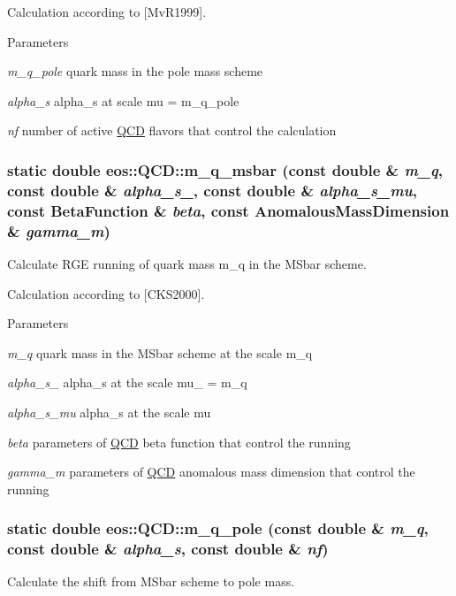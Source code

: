 Calculation according to \mbox{[}MvR1999\mbox{]}.


\begin{DoxyParams}{Parameters}
\item[{\em m\_\-q\_\-pole}]quark mass in the pole mass scheme \item[{\em alpha\_\-s}]alpha\_\-s at scale mu = m\_\-q\_\-pole \item[{\em nf}]number of active \hyperlink{classeos_1_1QCD}{QCD} flavors that control the calculation \end{DoxyParams}
\hypertarget{classeos_1_1QCD_ad982972648053f9f5a7e41ec73e07346}{
\subsubsection[{m\_\-q\_\-msbar}]{\setlength{\rightskip}{0pt plus 5cm}static double eos::QCD::m\_\-q\_\-msbar (const double \& {\em m\_\-q}, \/  const double \& {\em alpha\_\-s\_}, \/  const double \& {\em alpha\_\-s\_\-mu}, \/  const {\bf BetaFunction} \& {\em beta}, \/  const {\bf AnomalousMassDimension} \& {\em gamma\_\-m})}}
\label{classeos_1_1QCD_ad982972648053f9f5a7e41ec73e07346}
Calculate RGE running of quark mass m\_\-q in the MSbar scheme.

Calculation according to \mbox{[}CKS2000\mbox{]}.


\begin{DoxyParams}{Parameters}
\item[{\em m\_\-q}]quark mass in the MSbar scheme at the scale m\_\-q \item[{\em alpha\_\-s\_\-0}]alpha\_\-s at the scale mu\_ = m\_\-q \item[{\em alpha\_\-s\_\-mu}]alpha\_\-s at the scale mu \item[{\em beta}]parameters of \hyperlink{classeos_1_1QCD}{QCD} beta function that control the running \item[{\em gamma\_\-m}]parameters of \hyperlink{classeos_1_1QCD}{QCD} anomalous mass dimension that control the running \end{DoxyParams}
\hypertarget{classeos_1_1QCD_a1cd4a3d09f464732fd0639319f53c8ab}{
\subsubsection[{m\_\-q\_\-pole}]{\setlength{\rightskip}{0pt plus 5cm}static double eos::QCD::m\_\-q\_\-pole (const double \& {\em m\_\-q}, \/  const double \& {\em alpha\_\-s}, \/  const double \& {\em nf})}}
\label{classeos_1_1QCD_a1cd4a3d09f464732fd0639319f53c8ab}
Calculate the shift from MSbar scheme to pole mass.

